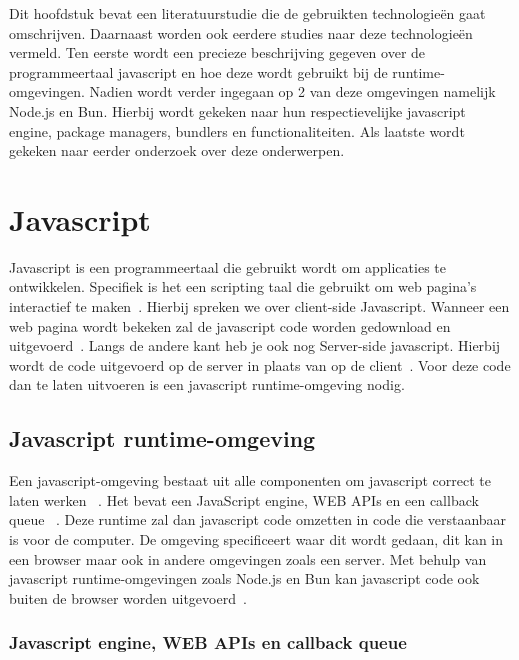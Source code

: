 Dit hoofdstuk bevat een literatuurstudie die de gebruikten technologieën gaat omschrijven. 
Daarnaast worden ook eerdere studies naar deze technologieën vermeld. 
Ten eerste wordt een precieze beschrijving gegeven over de programmeertaal javascript en hoe deze wordt gebruikt bij de runtime-omgevingen.
Nadien wordt verder ingegaan op 2 van deze omgevingen namelijk Node.js en Bun. 
Hierbij wordt gekeken naar hun respectievelijke javascript engine, package managers, bundlers en functionaliteiten.
Als laatste wordt gekeken naar eerder onderzoek over deze onderwerpen.

\section{Javascript}
Javascript is een programmeertaal die gebruikt wordt om applicaties te ontwikkelen. 
Specifiek is het een scripting taal die gebruikt om web pagina's interactief te maken~\autocite{Mozilla2023}.
Hierbij spreken we over client-side Javascript. Wanneer een web pagina wordt bekeken zal de javascript code worden 
gedownload en uitgevoerd~\autocite{JonathanBrownCFA2024}. Langs de andere kant heb je ook nog Server-side javascript. 
Hierbij wordt de code uitgevoerd op de server in plaats van op de client~\autocite{JonathanBrownCFA2024}. 
Voor deze code dan te laten uitvoeren is een javascript runtime-omgeving nodig. 

\subsection{Javascript runtime-omgeving}
Een javascript-omgeving bestaat uit alle componenten om javascript correct te laten werken ~\autocite{Christopher}. 
Het bevat een JavaScript engine, WEB APIs en een callback queue ~\autocite{Christopher}. 
Deze runtime zal dan javascript code omzetten in code die verstaanbaar is voor de computer.
De omgeving specificeert waar dit wordt gedaan, dit kan in een browser maar ook in andere omgevingen zoals een server.
Met behulp van javascript runtime-omgevingen zoals Node.js en Bun kan javascript code ook buiten de browser worden uitgevoerd~\autocite{Mozilla2023}.

\subsubsection{Javascript engine, WEB APIs en callback queue}

